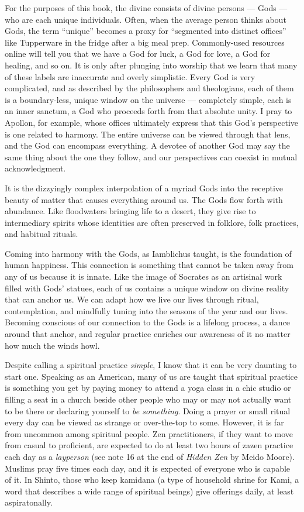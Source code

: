 \documentclass[
]{book}
\begin{document}
For the purposes of this book, the divine consists of divine persons --- Gods --- who are each unique individuals. Often, when the average person thinks about Gods, the term ``unique'' becomes a proxy for ``segmented into distinct offices'' like Tupperware in the fridge after a big meal prep. Commonly-used resources online will tell you that we have a God for luck, a God for love, a God for healing, and so on. It is only after plunging into worship that we learn that many of these labels are inaccurate and overly simplistic. Every God is very complicated, and as described by the philosophers and theologians, each of them is a boundary-less, unique window on the universe --- completely simple, each is an inner sanctum, a God who proceeds forth from that absolute unity. I pray to Apollon, for example, whose offices ultimately express that this God's perspective is one related to harmony. The entire universe can be viewed through that lens, and the God can encompass everything. A devotee of another God may say the same thing about the one they follow, and our perspectives can coexist in mutual acknowledgment.

It is the dizzyingly complex interpolation of a myriad Gods into the receptive beauty of matter that causes everything around us. The Gods flow forth with abundance. Like floodwaters bringing life to a desert, they give rise to intermediary spirits whose identities are often preserved in folklore, folk practices, and habitual rituals.

Coming into harmony with the Gods, as Iamblichus taught, is the foundation of human happiness. This connection is something that cannot be taken away from any of us because it is innate. Like the image of Socrates as an artisinal work filled with Gods' statues, each of us contains a unique window on divine reality that can anchor us. We can adapt how we live our lives through ritual, contemplation, and mindfully tuning into the seasons of the year and our lives. Becoming conscious of our connection to the Gods is a lifelong process, a dance around that anchor, and regular practice enriches our awareness of it no matter how much the winds howl.

Despite calling a spiritual practice \emph{simple}, I know that it can be very daunting to start one. Speaking as an American, many of us are taught that spiritual practice is something you get by paying money to attend a yoga class in a chic studio or filling a seat in a church beside other people who may or may not actually want to be there or declaring yourself to \emph{be something}. Doing a prayer or small ritual every day can be viewed as strange or over-the-top to some. However, it is far from uncommon among spiritual people. Zen practitioners, if they want to move from casual to proficient, are expected to do at least two hours of zazen practice each day as a \emph{layperson} (see note 16 at the end of \emph{Hidden Zen} by Meido Moore). Muslims pray five times each day, and it is expected of everyone who is capable of it. In Shinto, those who keep kamidana (a type of household shrine for Kami, a word that describes a wide range of spiritual beings) give offerings daily, at least aspiratonally.
\end{document}
